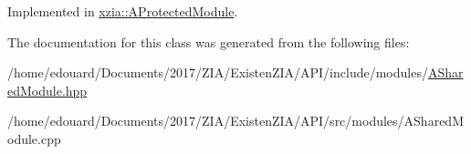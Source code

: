 Implemented in \mbox{\hyperlink{classxzia_1_1AProtectedModule_af8724b0d37b80ed8799c9f6b31dcdc2f}{xzia\+::\+A\+Protected\+Module}}.



The documentation for this class was generated from the following files\+:\begin{DoxyCompactItemize}
\item 
/home/edouard/\+Documents/2017/\+Z\+I\+A/\+Existen\+Z\+I\+A/\+A\+P\+I/include/modules/\mbox{\hyperlink{ASharedModule_8hpp}{A\+Shared\+Module.\+hpp}}\item 
/home/edouard/\+Documents/2017/\+Z\+I\+A/\+Existen\+Z\+I\+A/\+A\+P\+I/src/modules/A\+Shared\+Module.\+cpp\end{DoxyCompactItemize}
